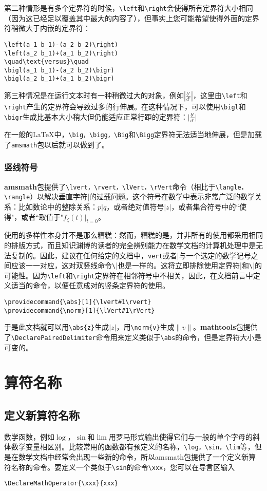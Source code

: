 \documentclass[openany]{ctexbook}
\DeclareMathOperator{\xxx}{xxx}
\begin{document}
第二种情形是有多个定界符的时候，\verb|\left|和\verb|\right|会使得所有定界符大小相同（因为这已经足以覆盖其中最大的内容了），但事实上您可能希望使得外面的定界符稍微大于内嵌的定界符：
\begin{verbatim}
\left(a_1 b_1)-(a_2 b_2)\right)
\left(a_2 b_1)+(a_1 b_2)\right)
\quad\text{versus}\quad
\bigl(a_1 b_1)-(a_2 b_2)\bigr)
\bigl(a_2 b_1)+(a_1 b_2)\bigr)
\end{verbatim}

第三种情况是在运行文本时有一种稍微过大的对象，例如$\left|\frac{b'}{d'}\right|$，这里由\verb|\left|和\verb|\right|产生的定界符会导致过多的行伸展。在这种情况下，可以使用\verb|\bigl|和\verb|\bigr|生成比基本大小稍大但仍能适应正常行距的定界符：$\bigl|\frac{b'}{d'}\bigr| $

在一般的\LaTeX 中，\verb|\big，\bigg，\Big|和\verb|\Bigg|定界符无法适当地伸展，但是加载了\verb|amsmath|包以后就可以做到了。
\subsection{竖线符号}
{\bfseries amsmath}包提供了\verb|\lvert，\rvert，\lVert，\rVert|命令（相比于\verb|\langle，\rangle|）以解决垂直字符\verb|||的过载问题。这个符号在数学中表示非常广泛的数学关系：比如数论中的整除关系：$p|q$，或者绝对值符号$|z|$，或者集合符号中的``使得"，或者``取值于"$f_\zeta(t)\big|_{t=0}$。

使用的多样性本身并不是那么糟糕：然而，糟糕的是，并非所有的使用都采用相同的排版方式，而且知识渊博的读者的完全辨别能力在数学文档的计算机处理中是无法复制的。因此，建议在任何给定的文档中，\verb|vert|或者\verb|||与一个选定的数学记号之间应该一一对应，这对双竖线命令\verb|\||也是一样的。这将立即排除使用定界符\verb|||和\verb|\||的可能性。因为\verb|\left|和\verb|\right|定界符在相邻符号中不相关，因此，在文档前言中定义适当的命令，以便任意成对的竖条定界符的使用。
\begin{verbatim}
\providecommand{\abs}[1]{\lvert#1\rvert}
\providecommand{\norm}[1]{\lVert#1\rVert}
\end{verbatim}
于是此文档就可以用\verb|\abs{z}|生成$|z|$，用\verb|\norm{v}|生成$\|v\|$。{\bfseries mathtools}包提供了\verb|\DeclarePairedDelimiter|命令用来定义类似于\verb|\abs|的命令，但是定界符大小是可变的。

\chapter{算符名称}
\section{定义新算符名称}
数学函数，例如$\log$，$\sin$和$\lim$用罗马形式输出使得它们与一般的单个字母的斜体数学变量相区别。比较常用的函数都有预定义的名称，\verb|\log，\sin，\lim|等，但是在数学文档中经常会出现一些新的命令，所以{amsmath}包提供了一个定义新算符名称的命令。要定义一个类似于\verb|\sin|的命令\verb|\xxx|，您可以在导言区输入
\begin{verbatim}
\DeclareMathOperator{\xxx}{xxx}
\end{verbatim}
\end{document}
